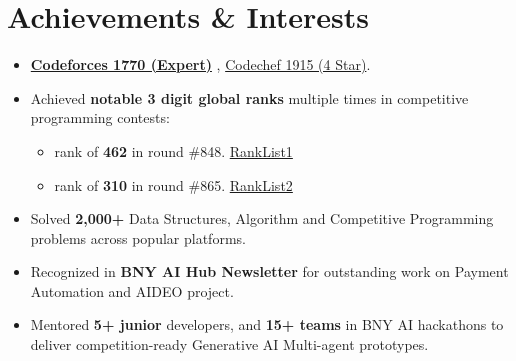 \documentclass[a4paper,10pt]{article}
\newenvironment{zitemize}{
\begin{itemize}\itemsep0pt \parskip0pt \parsep1pt}
{\end{itemize}\vspace{-0.7cm}}
\begin{document}
\section{Achievements \& Interests}
\vspace{-0.2cm}
\begin{zitemize}
    \item 
    \href{https://codeforces.com/profile/Ruhangrk}{{\textcolor{custompurple}{\textbf{Codeforces 1770 (Expert)}}}}  , 
    \href{https://www.codechef.com/users/ruhang}{{\textcolor{custompurple}{Codechef 1915 (4 Star)}}}.
    
    \item Achieved \textbf{notable 3 digit global ranks} multiple times in competitive programming contests:\vspace{-0.1cm}
    \begin{itemize}
        \item[-] rank of \textbf{462} in round \#848. 
        \href{https://codeforces.com/contest/1778/standings/participant/148805295#p148805295}{{\textcolor{custompurple}{RankList1}}}\vspace{-0.15cm}
        \item[-] rank of \textbf{310} in round \#865. 
        \href{https://codeforces.com/contest/1816/standings/participant/153368764#p153368764}{{\textcolor{custompurple}{RankList2}}} \vspace{-0.1cm}
    \end{itemize}
    
    
    
    \item Solved \textbf{2,000+} Data Structures, Algorithm and Competitive Programming problems across popular platforms.
    \item Recognized in \textbf{BNY AI Hub Newsletter} for outstanding work on Payment Automation and AIDEO project.
    \item Mentored \textbf{5+ junior}  developers, and \textbf{15+ teams } in BNY AI hackathons to deliver competition-ready Generative AI Multi-agent prototypes.

    
    
\end{zitemize}
\end{document}
